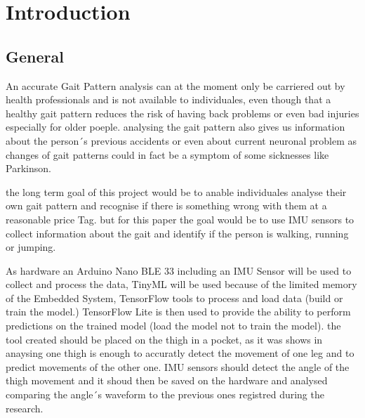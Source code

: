 %
%

\chapter{Introduction}
\label{Introduction}
\section{General}

An accurate Gait Pattern analysis can at the moment only be carriered out by health professionals  and is not available to individuales, even though that a healthy gait pattern reduces the risk of having back problems or even bad injuries especially for older poeple. 
analysing the gait pattern also gives us information about the person´s previous accidents or even about current neuronal problem as changes of gait patterns could in fact be a symptom of some sicknesses like Parkinson.

the long term goal of this project would be to anable individuales analyse their own gait pattern and recognise if there is something wrong with them at a reasonable price Tag. 
but for this paper the goal would be to use IMU sensors to collect information about the gait and identify if the person is walking, running or jumping.

As  hardware an Arduino Nano BLE 33  including an IMU Sensor will be used to collect and process the data, TinyML will be used because of the limited memory of the Embedded System, TensorFlow tools to process and load data (build or train the model.) TensorFlow Lite is then used to provide the ability to perform predictions on the trained model (load the model not to train the model). 
the tool created should be placed on the thigh in a pocket, as it was shows in \cite{AbhayasingheMurray:2014} anaysing one thigh is enough to accuratly detect the movement of one leg and to predict movements of the other one. IMU sensors should detect the angle of the thigh movement and it shoud then be saved on the hardware and analysed comparing the angle´s waveform to the previous ones registred during the research.\\

